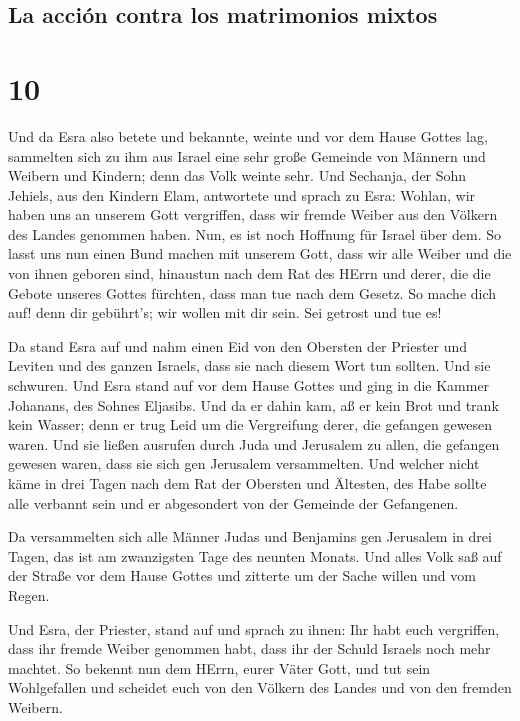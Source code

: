 \hypertarget{la-acciuxf3n-contra-los-matrimonios-mixtos}{%
\subsection{La acción contra los matrimonios
mixtos}\label{la-acciuxf3n-contra-los-matrimonios-mixtos}}

\hypertarget{section-9}{%
\section{10}\label{section-9}}

 Und da Esra also betete und bekannte, weinte und vor dem
Hause Gottes lag, sammelten sich zu ihm aus Israel eine sehr große
Gemeinde von Männern und Weibern und Kindern; denn das Volk weinte sehr.
 Und Sechanja, der Sohn Jehiels, aus den Kindern Elam,
antwortete und sprach zu Esra: Wohlan, wir haben uns an unserem Gott
vergriffen, dass wir fremde Weiber aus den Völkern des Landes genommen
haben. Nun, es ist noch Hoffnung für Israel über dem.  So
lasst uns nun einen Bund machen mit unserem Gott, dass wir alle Weiber
und die von ihnen geboren sind, hinaustun nach dem Rat des HErrn und
derer, die die Gebote unseres Gottes fürchten, dass man tue nach dem
Gesetz.  So mache dich auf! denn dir gebührt's; wir wollen
mit dir sein. Sei getrost und tue es!

 Da stand Esra auf und nahm einen Eid von den Obersten der
Priester und Leviten und des ganzen Israels, dass sie nach diesem Wort
tun sollten. Und sie schwuren.  Und Esra stand auf vor dem
Hause Gottes und ging in die Kammer Johanans, des Sohnes Eljasibs. Und
da er dahin kam, aß er kein Brot und trank kein Wasser; denn er trug
Leid um die Vergreifung derer, die gefangen gewesen waren.
 Und sie ließen ausrufen durch Juda und Jerusalem zu
allen, die gefangen gewesen waren, dass sie sich gen Jerusalem
versammelten.  Und welcher nicht käme in drei Tagen nach
dem Rat der Obersten und Ältesten, des Habe sollte alle verbannt sein
und er abgesondert von der Gemeinde der Gefangenen.

 Da versammelten sich alle Männer Judas und Benjamins gen
Jerusalem in drei Tagen, das ist am zwanzigsten Tage des neunten Monats.
Und alles Volk saß auf der Straße vor dem Hause Gottes und zitterte um
der Sache willen und vom Regen.

 Und Esra, der Priester, stand auf und sprach zu ihnen:
Ihr habt euch vergriffen, dass ihr fremde Weiber genommen habt, dass ihr
der Schuld Israels noch mehr machtet.  So bekennt nun dem
HErrn, eurer Väter Gott, und tut sein Wohlgefallen und scheidet euch von
den Völkern des Landes und von den fremden Weibern.

